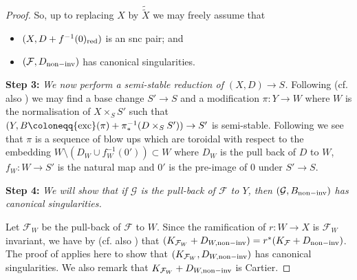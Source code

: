 \documentclass[12pt, a4paper]{amsart}
\newcounter{Theorem}
\theoremstyle{definition}
\theoremstyle{named}
\begin{document}
\begin{proof}
So, up to replacing $X$ by $\tilde{\tilde{X}}$ we may freely assume that 
\begin{itemize}
    \item $(X, D+f^{-1}(0)_{\rm red})$ is an snc pair; and
    \item $(\mathcal F, D_{{\rm non-inv}})$ has canonical singularities.
\end{itemize}





{\bf Step 3: }{
\it We now perform a semi-stable reduction of 
$(X, D) \rightarrow S$.} Following \cite[Chapter 2]{KKMS} (cf. also \cite[Theorem 2.58]{modbook})
we may find a base change $S' \rightarrow S$ 
and a modification $\pi\colon Y \rightarrow W$ where $W$ is the normalisation of 
$X\times_SS'$ such that 
$(Y, B\coloneqq {\rm exc}(\pi)+\pi_*^{-1}(D\times_SS')) \rightarrow S'$ is semi-stable.
Following \cite[Chapter 2]{KKMS} we see that $\pi$ is a sequence of blow ups
which are toroidal with respect to the embedding $W \setminus (D_W \cup f_W^{-1}(0')) \subset W$
where $D_W$ is the pull back of $D$ to $W$, $f_W \colon W \to S'$ is the natural map and $0'$ is the pre-image of $0$ under $S' \to S$.

{\bf Step 4: }{\it 
We will show that if $\mathcal G$ is the pull-back of $\mathcal F$ to $Y$, 
then $(\mathcal G, B_{{\rm non-inv}})$ has canonical singularities.}

Let $\mathcal F_{W}$ be the pull-back of $\mathcal F$ 
to $W$.
Since the ramification of $r\colon W \rightarrow X$ is $\mathcal F_W$ invariant,
we have by \cite[Lemma 3.4]{Druel21} (cf. also \cite[Proposition 2.2]{CS20})
that $(K_{\mathcal F_W}+D_{W, {\rm non-inv}}) = r^*(K_{\mathcal F}+D_{{\rm non-inv}})$.
The proof of \cite[Proposition 5.20]{KM98} 
applies here to show that $(K_{\mathcal F_{W}}, D_{W, {\rm non-inv}})$ has canonical singularities.
We also remark that $K_{\mathcal F_W}+D_{W, {\rm non-inv}}$ is Cartier.



\end{proof}
\end{document}
